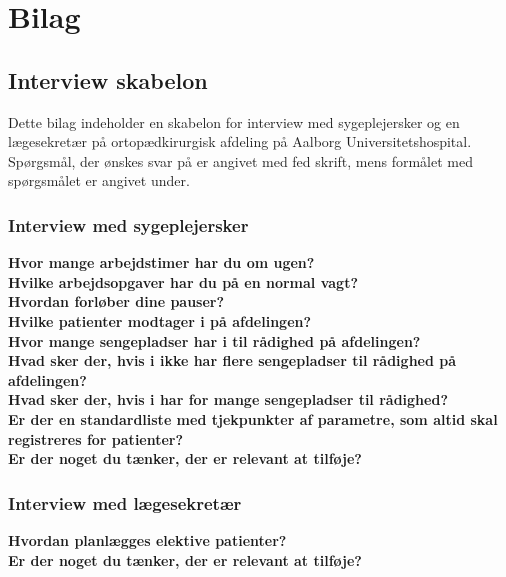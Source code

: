 \chapter{Bilag}

\section{Interview skabelon} \label{bilagA}
Dette bilag indeholder en skabelon for interview med sygeplejersker og en lægesekretær på ortopædkirurgisk afdeling på Aalborg Universitetshospital. Spørgsmål, der ønskes svar på er angivet med fed skrift, mens formålet med spørgsmålet er angivet under. 

\subsection{Interview med sygeplejersker}
\textbf{Hvor mange arbejdstimer har du om ugen?} \\
\noindent
\textbf{Hvilke arbejdsopgaver har du på en normal vagt?} \\
\noindent
\textbf{Hvordan forløber dine pauser?} \\
\noindent
\textbf{Hvilke patienter modtager i på afdelingen?} \\
\noindent
\textbf{Hvor mange sengepladser har i til rådighed på afdelingen?}  \\
\noindent
\textbf{Hvad sker der, hvis i ikke har flere sengepladser til rådighed på afdelingen?} \\
\noindent
\textbf{Hvad sker der, hvis i har for mange sengepladser til rådighed?} \\
\noindent
\textbf{Er der en standardliste med tjekpunkter af parametre, som altid skal registreres for patienter?} \\
\noindent
\textbf{Er der noget du tænker, der er relevant at tilføje?} \\

\subsection{Interview med lægesekretær}
\textbf{Hvordan planlægges elektive patienter?} \\
\noindent
\textbf{Er der noget du tænker, der er relevant at tilføje?} \\




